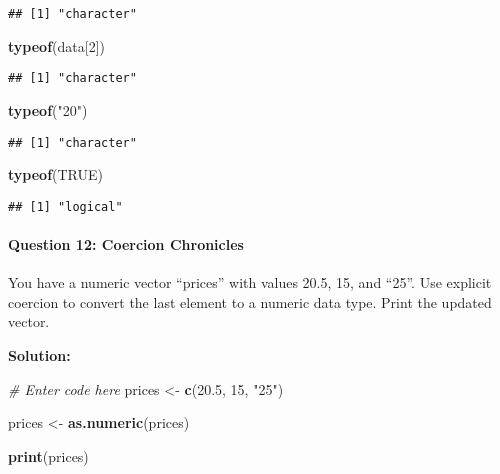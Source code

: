 \documentclass[
]{article}
\newenvironment{Shaded}{\begin{snugshade}}{\end{snugshade}}
\newcommand{\CommentTok}[1]{\textcolor[rgb]{0.56,0.35,0.01}{\textit{#1}}}
\newcommand{\ConstantTok}[1]{\textcolor[rgb]{0.56,0.35,0.01}{#1}}
\newcommand{\DecValTok}[1]{\textcolor[rgb]{0.00,0.00,0.81}{#1}}
\newcommand{\FloatTok}[1]{\textcolor[rgb]{0.00,0.00,0.81}{#1}}
\newcommand{\FunctionTok}[1]{\textcolor[rgb]{0.13,0.29,0.53}{\textbf{#1}}}
\newcommand{\NormalTok}[1]{#1}
\newcommand{\OtherTok}[1]{\textcolor[rgb]{0.56,0.35,0.01}{#1}}
\newcommand{\StringTok}[1]{\textcolor[rgb]{0.31,0.60,0.02}{#1}}
\begin{document}
\begin{verbatim}
## [1] "character"
\end{verbatim}

\begin{Shaded}
\begin{Highlighting}[]
\FunctionTok{typeof}\NormalTok{(data[}\DecValTok{2}\NormalTok{])}
\end{Highlighting}
\end{Shaded}

\begin{verbatim}
## [1] "character"
\end{verbatim}

\begin{Shaded}
\begin{Highlighting}[]
\FunctionTok{typeof}\NormalTok{(}\StringTok{"20"}\NormalTok{)}
\end{Highlighting}
\end{Shaded}

\begin{verbatim}
## [1] "character"
\end{verbatim}

\begin{Shaded}
\begin{Highlighting}[]
\FunctionTok{typeof}\NormalTok{(}\ConstantTok{TRUE}\NormalTok{)}
\end{Highlighting}
\end{Shaded}

\begin{verbatim}
## [1] "logical"
\end{verbatim}

\hypertarget{question-12-coercion-chronicles}{%
\paragraph{Question 12: Coercion
Chronicles}\label{question-12-coercion-chronicles}}

You have a numeric vector ``prices'' with values 20.5, 15, and ``25''.
Use explicit coercion to convert the last element to a numeric data
type. Print the updated vector.

\textbf{Solution:}

\begin{Shaded}
\begin{Highlighting}[]
\CommentTok{\# Enter code here}
\NormalTok{prices }\OtherTok{\textless{}{-}} \FunctionTok{c}\NormalTok{(}\FloatTok{20.5}\NormalTok{, }\DecValTok{15}\NormalTok{, }\StringTok{"25"}\NormalTok{)}

\NormalTok{prices }\OtherTok{\textless{}{-}} \FunctionTok{as.numeric}\NormalTok{(prices)}

\FunctionTok{print}\NormalTok{(prices)}
\end{Highlighting}
\end{Shaded}
\end{document}
